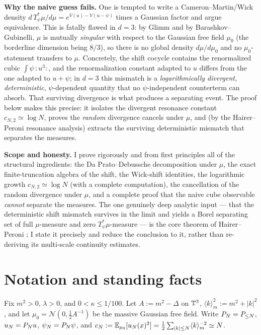\medskip
\noindent\textbf{Why the naive guess fails.} One is tempted to write a
Cameron--Martin/Wick density $d\,T_\psi^*\mu/d\mu=e^{V(u)-V(u-\psi)}$ times a Gaussian
factor and argue equivalence. This is fatally flawed in $d=3$: by Glimm and by
Barashkov--Gubinelli, $\mu$ is mutually \emph{singular} with respect to the Gaussian
free field $\mu_0$ (the borderline dimension being $8/3$), so there is no global
density $d\mu/d\mu_0$ and no $\mu_0$-statement transfers to $\mu$. Concretely, the
shift cocycle contains the renormalized cubic $\int\psi\,{:}u^3{:}$, and the
renormalization constant adapted to $u$ differs from the one adapted to $u+\psi$; in
$d=3$ this mismatch is a \emph{logarithmically divergent, deterministic},
$\psi$-dependent quantity that no $\psi$-independent counterterm can absorb. That
surviving divergence is what produces a separating event. The proof below makes this
precise: it isolates the divergent resonance constant $c_{N,2}\simeq\log N$, proves
the \emph{random} divergence cancels under $\mu$, and (by the Hairer--Peroni resonance
analysis) extracts the surviving deterministic mismatch that separates the measures.

\medskip
\noindent\textbf{Scope and honesty.} I prove rigorously and from first principles all
of the structural ingredients: the Da Prato--Debussche decomposition under $\mu$, the
exact finite-truncation algebra of the shift, the Wick-shift identities, the
logarithmic growth $c_{N,2}\simeq\log N$ (with a complete computation), the
cancellation of the random divergence under $\mu$, and a complete proof that the naive
cube observable \emph{cannot} separate the measures. The one genuinely deep analytic
input --- that the deterministic shift mismatch survives in the limit and yields a
Borel separating set of full $\mu$-measure and zero $T_\psi^*\mu$-measure --- is the
core theorem of Hairer--Peroni \cite{HP25}; I state it precisely and reduce the
conclusion to it, rather than re-deriving its multi-scale continuity estimates.

\section*{Notation and standing facts}

Fix $m^2>0$, $\lambda>0$, and $0<\kappa\le 1/100$. Let $A:=m^2-\Delta$ on $\mathbb{T}^3$,
$\langle k\rangle_m^2:=m^2+|k|^2$, and let $\mu_0=\mathcal N(0,\tfrac12A^{-1})$ be the
massive Gaussian free field. Write $P_N=P_{\le N}$, $u_N=P_N u$,
$\psi_N=P_N\psi$, and
$c_N:=\mathbb{E}_{\mu_0}[u_N(x)^2]=\tfrac12\sum_{|k|\le N}\langle k\rangle_m^{-2}\simeq N$.

